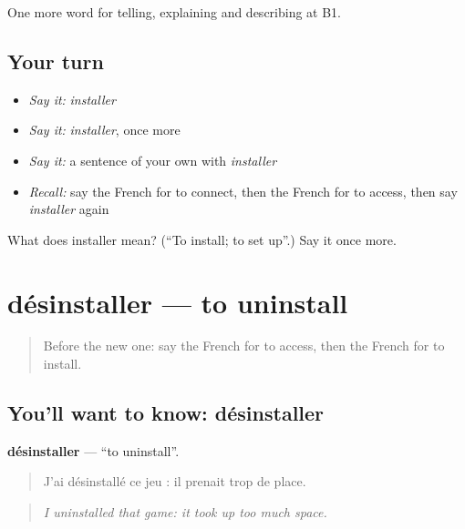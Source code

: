 \begin{grammarlens}[title={What you've built}]
One more word for telling, explaining and describing at B1.
\end{grammarlens}

\subsection*{Your turn}
\begin{itemize}
\raggedright
  \item \emph{Say it:} \emph{installer}
  \item \emph{Say it:} \emph{installer}, once more
  \item \emph{Say it:} a sentence of your own with \emph{installer}
  \item \emph{Recall:} say the French for to connect, then the French for to access, then say \emph{installer} again
\end{itemize}

\begin{tcolorbox}[breakable,colback=teal!4,colframe=teal!35!black,title={Before you move on}]
What does installer mean? (\textquotedblleft{}To install; to set up\textquotedblright{}.) Say it once more.
\end{tcolorbox}
\section[désinstaller]{désinstaller — to uninstall}

\label{lesson:FR-C396-desinstaller}



\begin{quote}
Before the new one: say the French for to access, then the French for to install.
\end{quote}

\subsection*{You'll want to know: désinstaller}
\textbf{désinstaller} — \textquotedblleft{}to uninstall\textquotedblright{}.

\begin{quote}
J'ai désinstallé ce jeu : il prenait trop de place.
\end{quote}

\begin{quote}
\emph{I uninstalled that game: it took up too much space.}
\end{quote}

